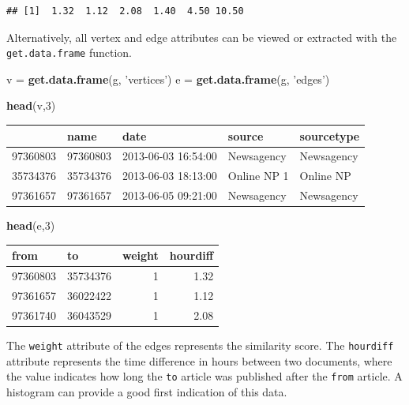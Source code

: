 \documentclass[]{article}
\newenvironment{Shaded}{\begin{snugshade}}{\end{snugshade}}
\newcommand{\KeywordTok}[1]{\textcolor[rgb]{0.13,0.29,0.53}{\textbf{{#1}}}}
\newcommand{\DataTypeTok}[1]{\textcolor[rgb]{0.13,0.29,0.53}{{#1}}}
\newcommand{\DecValTok}[1]{\textcolor[rgb]{0.00,0.00,0.81}{{#1}}}
\newcommand{\StringTok}[1]{\textcolor[rgb]{0.31,0.60,0.02}{{#1}}}
\newcommand{\NormalTok}[1]{{#1}}
\begin{document}
\begin{verbatim}
## [1]  1.32  1.12  2.08  1.40  4.50 10.50
\end{verbatim}

Alternatively, all vertex and edge attributes can be viewed or extracted
with the \texttt{get.data.frame} function.

\begin{Shaded}
\begin{Highlighting}[]
\NormalTok{v =}\StringTok{ }\KeywordTok{get.data.frame}\NormalTok{(g, }\StringTok{'vertices'}\NormalTok{)}
\NormalTok{e =}\StringTok{ }\KeywordTok{get.data.frame}\NormalTok{(g, }\StringTok{'edges'}\NormalTok{)}

\KeywordTok{head}\NormalTok{(v,}\DecValTok{3}\NormalTok{)}
\end{Highlighting}
\end{Shaded}

\begin{longtable}[c]{@{}lllll@{}}
\toprule
& name & date & source & sourcetype\tabularnewline
\midrule
\endhead
97360803 & 97360803 & 2013-06-03 16:54:00 & Newsagency &
Newsagency\tabularnewline
35734376 & 35734376 & 2013-06-03 18:13:00 & Online NP 1 & Online
NP\tabularnewline
97361657 & 97361657 & 2013-06-05 09:21:00 & Newsagency &
Newsagency\tabularnewline
\bottomrule
\end{longtable}

\begin{Shaded}
\begin{Highlighting}[]
\KeywordTok{head}\NormalTok{(e,}\DecValTok{3}\NormalTok{)    }
\end{Highlighting}
\end{Shaded}

\begin{longtable}[c]{@{}llrr@{}}
\toprule
from & to & weight & hourdiff\tabularnewline
\midrule
\endhead
97360803 & 35734376 & 1 & 1.32\tabularnewline
97361657 & 36022422 & 1 & 1.12\tabularnewline
97361740 & 36043529 & 1 & 2.08\tabularnewline
\bottomrule
\end{longtable}

The \texttt{weight} attribute of the edges represents the similarity
score. The \texttt{hourdiff} attribute represents the time difference in
hours between two documents, where the value indicates how long the
\texttt{to} article was published after the \texttt{from} article. A
histogram can provide a good first indication of this data.

\begin{Shaded}
\end{Shaded}
\end{document}
